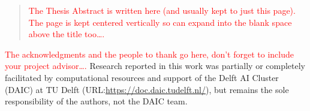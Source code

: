 \documentclass[
11pt, %
english, %
singlespacing, %
parskip, %
headsepline, %
dvipsnames]{misc/MastersDoctoralThesis} %
\theoremstyle{definition}
\newcommand\todo[1]{\textcolor{red}{#1}}
\begin{document}


\begin{abstract}
  \addchaptertocentry{\abstractname} %
  \todo{The Thesis Abstract is written here (and usually kept to just this page). The page is kept centered vertically so can expand into the blank space above the title too\ldots.}
\end{abstract}


\begin{acknowledgements}
  \addchaptertocentry{\acknowledgementname} %
  \todo{The acknowledgments and the people to thank go here, don't forget to include your project advisor\ldots.} Research reported in this work was partially or completely facilitated by computational resources and support of the Delft AI Cluster (DAIC) at TU Delft (URL:\url{https://doc.daic.tudelft.nl/}), but remains the sole responsibility of the authors, not the DAIC team.
\end{acknowledgements}


\tableofcontents %

\listoffigures %

\listoftables %




\end{document}
